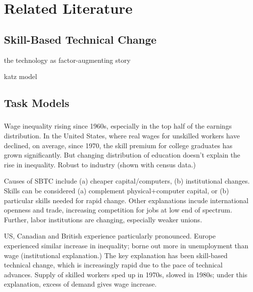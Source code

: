 \chapter{Related Literature}


\section{Skill-Based Technical Change}

 the technology as factor-augmenting story

 katz model

\section{Task Models}

\subsection{\citet{Levy2003}}

\subsection{\citet{Acemoglu2011}}

Wage inequality rising since 1960s, especially in the top half of the earnings distribution. In the United States, where real wages for unskilled workers have declined, on average, since 1970, the skill premium for college graduates has grown significantly. But changing distribution of education doesn't explain the rise in inequality. Robust to industry (shown with census data.)

Causes of SBTC include (a) cheaper capital/computers, (b) institutional changes. Skills can be considered (a) complement physical+computer capital, or (b) particular skills needed for rapid change. Other explanations incude international openness and trade, increasing competition for jobs at low end of spectrum. Further, labor institutions are changing, especially weaker unions.
                
US, Canadian and British experience particularly pronounced. Europe experienced similar increase in inequality; borne out more in unemployment than wage (institutional explanation.) The key explanation has been skill-based technical change, which is increasingly rapid due to the pace of technical advances. Supply of skilled workers sped up in 1970s, slowed in 1980s; under this explanation, excess of demand gives wage increase.

